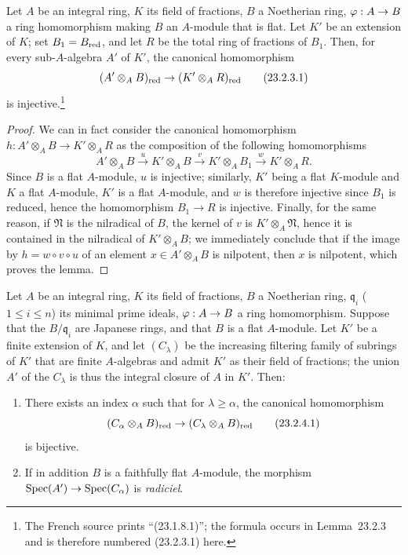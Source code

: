 \begin{lemma}[23.2.3]
\label{0.23.2.3}
Let $A$ be an integral ring, $K$ its field of fractions, $B$ a Noetherian ring, $\varphi:A\to B$ a ring homomorphism making $B$ an $A$-module that is flat.
Let $K'$ be an extension of $K$; set $B_1=B_{\mathrm{red}}$, and let $R$ be the total ring of fractions of $B_1$.
Then, for every sub-$A$-algebra $A'$ of $K'$, the canonical homomorphism
\[
\label{0.23.2.3.1}
  (A'\otimes_A B)_{\mathrm{red}}\to(K'\otimes_A R)_{\mathrm{red}}
  \tag{23.2.3.1}
\]
is injective.\footnote{The French source prints ``(23.1.8.1)''; the formula occurs in Lemma~23.2.3 and is therefore numbered (23.2.3.1) here.}
\end{lemma}

\begin{proof}
We can in fact consider the canonical homomorphism $h:A'\otimes_A B\to K'\otimes_A R$ as the composition of the following homomorphisms
\[
  A'\otimes_A B\xrightarrow{u}K'\otimes_A B\xrightarrow{v}K'\otimes_A B_1\xrightarrow{w}K'\otimes_A R.
\]
Since $B$ is a flat $A$-module, $u$ is injective; similarly, $K'$ being a flat $K$-module and $K$ a flat $A$-module, $K'$ is a flat $A$-module, and $w$ is therefore injective since $B_1$ is reduced, hence the homomorphism $B_1\to R$ is injective.
Finally, for the same reason, if $\mathfrak{N}$ is
the nilradical of $B$, the kernel of $v$ is $K'\otimes_A\mathfrak{N}$, hence it is contained in the nilradical of $K'\otimes_A B$; we immediately conclude that if the image by $h=w\circ v\circ u$ of an element $x\in A'\otimes_A B$ is nilpotent, then $x$ is nilpotent, which proves the lemma.
\end{proof}

\begin{proposition}[23.2.4]
\label{0.23.2.4}
Let $A$ be an integral ring, $K$ its field of fractions, $B$ a Noetherian ring, $\mathfrak{q}_i$ ($1\leq i\leq n$) its minimal prime ideals, $\varphi:A\to B$ a ring homomorphism.
Suppose that the $B/\mathfrak{q}_i$ are Japanese rings, and that $B$ is a flat $A$-module.
Let $K'$ be a finite extension of $K$, and let $(C_\lambda)$ be the increasing filtering family of subrings of $K'$ that are finite $A$-algebras and admit $K'$ as their field of fractions; the union $A'$ of the $C_\lambda$ is thus the integral closure of $A$ in $K'$.
Then:
\begin{enumerate}
  \item[{\rm(i)}] There exists an index $\alpha$ such that for $\lambda\geq\alpha$, the canonical homomorphism
    \[
    \label{0.23.2.4.1}
      (C_\alpha\otimes_A B)_{\mathrm{red}}\to(C_\lambda\otimes_A B)_{\mathrm{red}}
      \tag{23.2.4.1}
    \]
    is bijective.
  \item[{\rm(ii)}] If in addition $B$ is a faithfully flat $A$-module, the morphism $\operatorname{Spec}(A')\to\operatorname{Spec}(C_\alpha)$ is \emph{radiciel}.
\end{enumerate}
\end{proposition}

